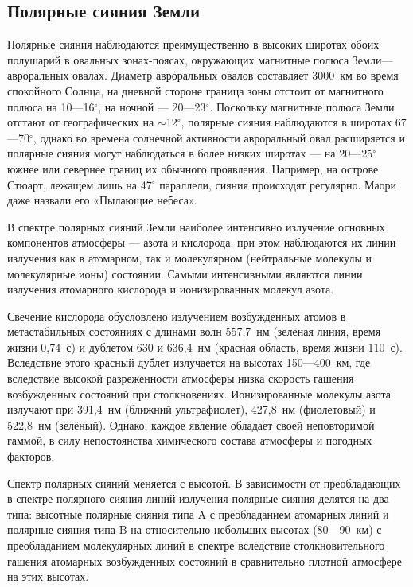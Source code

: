 \documentclass[a4paper,14pt]{article}
\begin{document}
\subsection*{Полярные сияния Земли}

Полярные сияния наблюдаются преимущественно в высоких широтах
обоих полушарий в овальных зонах-поясах, окружающих магнитные полюса Земли---авроральных овалах. Диаметр авроральных овалов составляет 3000~км во время спокойного Солнца, на дневной стороне граница зоны отстоит от магнитного полюса на
10---16${}^\circ$, на ночной --- 20---23${}^\circ$. Поскольку магнитные полюса Земли отстают от географических на $\sim$12${}^\circ$, полярные сияния наблюдаются в широтах 67---70${}^\circ$, однако во времена солнечной активности авроральный овал расширяется и полярные сияния могут наблюдаться в более низких широтах --- на 20---25${}^\circ$ южнее или севернее границ их обычного проявления. Например, на острове Стюарт, лежащем лишь на 47${}^\circ$ параллели, сияния происходят регулярно. Маори даже назвали его «Пылающие небеса».

В спектре полярных сияний Земли наиболее интенсивно излучение
основных компонентов атмосферы --- азота и кислорода, при этом наблюдаются их линии излучения как в атомарном, так и молекулярном (нейтральные молекулы и молекулярные ионы) состоянии. Самыми интенсивными являются линии излучения атомарного кислорода и ионизированных молекул азота.

Свечение кислорода обусловлено излучением возбужденных атомов в метастабильных состояниях с длинами волн 557,7~нм (зелёная линия, время жизни 0,74~с) и дублетом
630 и 636,4~нм (красная область, время жизни 110~с). Вследствие этого красный дублет излучается на высотах 150---400~км, где вследствие высокой разреженности атмосферы низка скорость гашения возбужденных состояний при столкновениях. Ионизированные молекулы азота излучают при 391,4~нм (ближний ультрафиолет), 427,8~нм (фиолетовый) и 522,8~нм (зелёный). Однако, каждое явление обладает своей неповторимой гаммой, в силу непостоянства химического состава атмосферы и погодных факторов.

Спектр полярных сияний меняется с высотой. В зависимости от преобладающих в спектре полярного сияния линий излучения полярные сияния делятся на два типа: высотные полярные сияния типа A с преобладанием атомарных линий и полярные сияния типа B на относительно небольших высотах (80---90~км) с преобладанием молекулярных линий в спектре вследствие столкновительного гашения атомарных возбужденных состояний в сравнительно плотной атмосфере на этих высотах.
\end{document}

